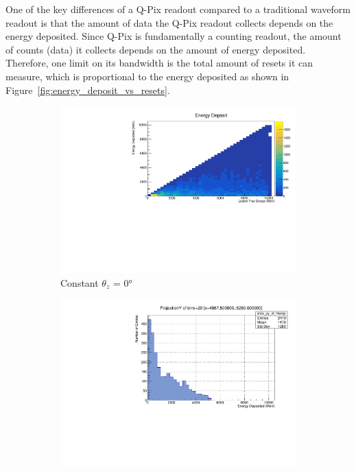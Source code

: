 One of the key differences of a Q-Pix readout compared to a traditional waveform readout is that the amount of data the Q-Pix readout collects depends on the energy deposited.
Since Q-Pix is fundamentally a counting readout, the amount of counts (data) it collects depends on the amount of energy deposited.
Therefore, one limit on its bandwidth is the total amount of resets it can measure, which is proportional to the energy deposited as shown in Figure~\ref{fig:energy_deposit_vs_resets}.

\begin{figure}
\centering
\begin{subfigure}{.5\textwidth}
  \centering
  \includegraphics[width=\textwidth]{images/electron_nu_energy_deposit.pdf}
  \caption{Constant $\theta_{z}$ = 0\unit{\degree}}
\end{subfigure}%
\begin{subfigure}{.5\textwidth}
  \centering
  \includegraphics[width=\textwidth]{images/electron_nu_energy_deposit_slice.pdf}

\end{subfigure}
\end{figure}
